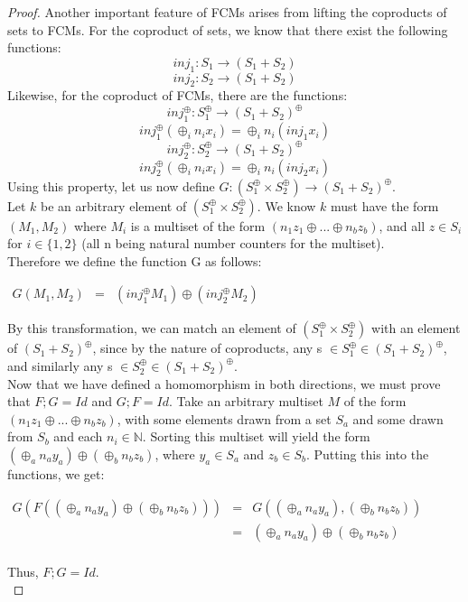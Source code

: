 \begin{lemma}
\begin{proof}
Another important feature of FCMs arises from lifting the coproducts of sets to FCMs. For the coproduct of sets, we know that there exist the following functions:\\
\[inj_1: S_1 \to (S_1 + S_2) \]
\[inj_2: S_2 \to (S_1 + S_2)\]
Likewise, for the coproduct of FCMs, there are the functions: \\
\[inj^\oplus_1: S_1^\oplus \to (S_1 + S_2)^\oplus  \]
\[inj^\oplus_1(\oplus_i n_i x_i) = \oplus_i n_i(inj_1 x_i)\]
\smallskip
\[inj^\oplus_2: S_2^\oplus \to (S_1 + S_2)^\oplus \]
\[ inj^\oplus_2(\oplus_i n_i x_i) = \oplus_i n_i(inj_2 x_i)\]
Using this property, let us now define $G: (S_1 ^\oplus \times S_2 ^\oplus) \to (S_1 + S_2)^\oplus$.\\
Let $k$ be an arbitrary element of $(S_1 ^\oplus \times S_2 ^\oplus)$. We know $k$ must have the form $(M_1 , M_2)$ where $M_i$ is a multiset of the form $(n_1z_1 \oplus ... \oplus n_bz_b)$, and all $z \in S_i$ for $i\in\{1, 2\}$ (all n being natural number counters for the multiset).\\
Therefore we define the function G as follows:\\
\begin{center}
  \begin{math}
    \begin{array}{lll}
       G(M_1, M_2) & = & (inj_1^\oplus M_1) \oplus (inj_2^\oplus M_2)
    \end{array}
  \end{math}
\end{center}
By this transformation, we can match an element of $(S_1 ^\oplus \times S_2 ^\oplus)$ with an element of $(S_1 + S_2)^\oplus$, since by the nature of coproducts, any s $\in S_1^\oplus \in (S_1+S_2)^\oplus$, and similarly any s $\in S_2^\oplus \in (S_1+S_2)^\oplus$.\bigskip \\

Now that we have defined a homomorphism in both directions, we must
prove that $F;G = Id$ and $G;F = Id$. Take an arbitrary multiset $M$
of the form $(n_1z_1 \oplus ... \oplus n_bz_b)$, with some elements
drawn from a set $S_a$ and some drawn from $S_b$ and each $n_i \in
\mathbb{N}$. Sorting this multiset will yield the form $(\oplus_a n_a
y_a) \oplus (\oplus_b n_b z_b)$, where $y_a \in S_a$ and $z_b \in
S_b$. Putting this into the functions, we get:
\begin{center}
  \begin{math}
    \begin{array}{lll}
      G(F((\oplus_a n_a y_a) \oplus (\oplus_b n_b z_b)))
      & = & G((\oplus_a n_a y_a), (\oplus_b n_b z_b))\\
      & = & (\oplus_a n_a y_a) \oplus (\oplus_b n_b z_b)\\
    \end{array}
  \end{math}
\end{center}
Thus, $F;G = Id$.\\


\end{proof}
\end{lemma}
